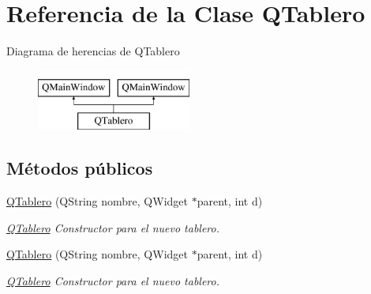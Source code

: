 \hypertarget{class_q_tablero}{\section{Referencia de la Clase Q\-Tablero}
\label{class_q_tablero}
}
Diagrama de herencias de Q\-Tablero\begin{figure}[H]
\begin{center}
\leavevmode
\includegraphics[height=2.000000cm]{class_q_tablero}
\end{center}
\end{figure}
\subsection*{Métodos públicos}
\begin{DoxyCompactItemize}
\item 
\hyperlink{class_q_tablero_ad874f712d2619e753ec1d2e454545d6b}{Q\-Tablero} (Q\-String nombre, Q\-Widget $\ast$parent, int d)
\begin{DoxyCompactList}\small\item\em \hyperlink{class_q_tablero}{Q\-Tablero} Constructor para el nuevo tablero. \end{DoxyCompactList}\item 
\hyperlink{class_q_tablero_ad874f712d2619e753ec1d2e454545d6b}{Q\-Tablero} (Q\-String nombre, Q\-Widget $\ast$parent, int d)
\begin{DoxyCompactList}\small\item\em \hyperlink{class_q_tablero}{Q\-Tablero} Constructor para el nuevo tablero. \end{DoxyCompactList}\end{DoxyCompactItemize}
